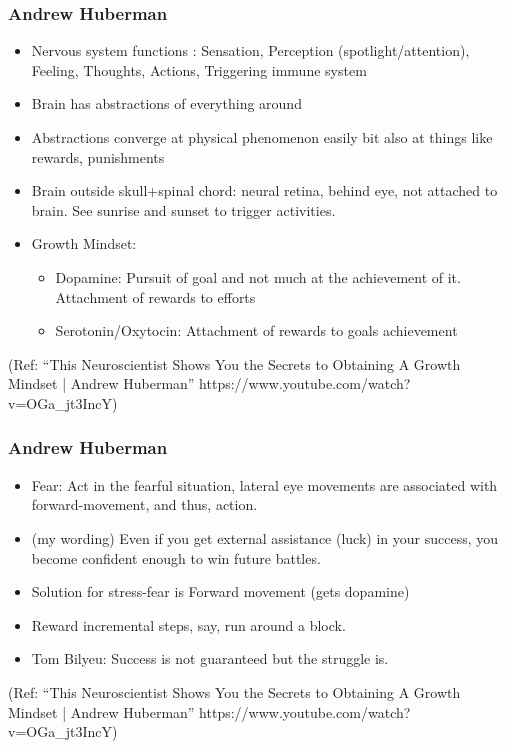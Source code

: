 \begin{frame}[fragile]\frametitle{Andrew Huberman}


	\begin{itemize}
\item  Nervous system functions : Sensation, Perception (spotlight/attention), Feeling, Thoughts, Actions, Triggering immune system
\item  Brain has abstractions of everything around
\item  Abstractions converge at physical phenomenon easily bit also at things like rewards, punishments
\item  Brain outside skull+spinal chord: neural retina, behind eye, not attached to brain. See sunrise and sunset to trigger activities.
\item  Growth Mindset:
	\begin{itemize}
	\item  Dopamine: Pursuit of goal and not much at the achievement of it. Attachment of rewards to efforts
	\item  Serotonin/Oxytocin: Attachment of rewards to goals achievement
	\end{itemize}

\end{itemize}


{\tiny (Ref: ``This Neuroscientist Shows You the Secrets to Obtaining A Growth Mindset | Andrew Huberman'' https://www.youtube.com/watch?v=OGa\_jt3IncY)}

\end{frame}

\begin{frame}[fragile]\frametitle{Andrew Huberman}


	\begin{itemize}
\item  Fear: Act in the fearful situation, lateral eye movements are associated with forward-movement, and thus, action.
\item  (my wording) Even if you get external assistance (luck) in your success, you become confident enough to win future battles.
\item  Solution for stress-fear is Forward movement (gets dopamine)
\item  Reward incremental steps, say, run around a block.
\item  Tom Bilyeu: Success is not guaranteed but the struggle is.

\end{itemize}

{\tiny (Ref: ``This Neuroscientist Shows You the Secrets to Obtaining A Growth Mindset | Andrew Huberman'' https://www.youtube.com/watch?v=OGa\_jt3IncY)}


\end{frame}

